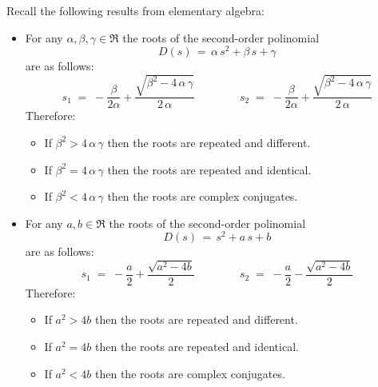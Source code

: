 \documentclass[ 10pt, xcolor = dvipsnames]{beamer}
\begin{document}
\begin{frame}[allowframebreaks]
\frametitle{\insertsection}

Recall the following results from elementary algebra: 
\begin{itemize}
\item For any $\alpha, \beta, \gamma \in \Re$ the roots of the second-order polinomial 
\[
D(s) \, = \, \alpha \, s^2 + \beta \, s + \gamma
\]
are as follows:  
\[
s_1 \; = \; 
-\frac{\beta}{2 \alpha} + \frac{\sqrt{ \beta^2 - 4 \, \alpha \, \gamma }}{2 \, \alpha} \qquad \qquad
s_2 \; = \; 
-\frac{\beta}{2 \alpha} + \frac{\sqrt{ \beta^2 - 4 \, \alpha \, \gamma }}{2 \, \alpha}
\]
Therefore: 
\begin{itemize}
\item If $\beta^2 > 4 \, \alpha \, \gamma$ then the roots are repeated and different. 
\item If $\beta^2 = 4 \, \alpha \, \gamma$ then the roots are repeated and identical. 
\item If $\beta^2 < 4 \, \alpha \, \gamma$ then the roots are complex conjugates. 
\end{itemize}
\framebreak

\item For any $a, b \in \Re$ the roots of the second-order polinomial 
\[
D(s) \, = \, s^2 + a \, s + b
\]
are as follows:  
\[
s_1 \; = \; 
-\frac{a}{2} + \frac{\sqrt{ a^2 - 4b }}{2} \qquad \qquad
s_2 \; = \; 
-\frac{a}{2} - \frac{\sqrt{ a^2 - 4b }}{2}
\]
Therefore: 
\begin{itemize}
\item If $a^2 > 4 b$ then the roots are repeated and different. 
\item If $a^2 = 4 b$ then the roots are repeated and identical. 
\item If $a^2 < 4 b$ then the roots are complex conjugates. 
\end{itemize}

\end{itemize}

\end{frame}


\end{document}
